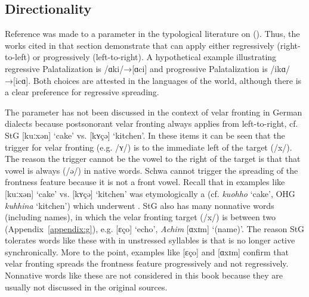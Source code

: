 \subsection{Directionality}\label{sec:6.5.2}

Reference was made to a  parameter in the typological literature on  (). Thus, the works cited in that section demonstrate that  can apply either regressively (right-to-left) or progressively (left-to-right). A hypothetical example illustrating regressive Palatalization is /ɑki/→[ɑci] and progressive Palatalization is /ikɑ/→[icɑ]. Both choices are attested in the languages of the world, although there is a clear preference for regressive spreading.

The  parameter has not been discussed in the context of velar fronting in German dialects because postsonorant velar fronting always applies from left-to-right, cf. StG [kuːxən] ‘cake’ vs. [kʏçə] ‘kitchen’. In these items it can be seen that the trigger for velar fronting (e.g. /ʏ/) is to the immediate left of the target (/x/). The reason the trigger cannot be the vowel to the right of the target is that that vowel is always  (/ə/) in native words. Schwa cannot trigger the spreading of the frontness feature because it is not a front vowel. Recall that  in examples like [kuːxən] ‘cake’ vs. [kʏçə] ‘kitchen’ was etymologically a  (cf.  \textit{kuohho} ‘cake’, OHG \textit{kuhhina} ‘kitchen’) which underwent . StG also has many nonnative words (including names), in which the velar fronting target (/x/) is between two  (Appendix~\ref{appendix:g}), e.g. [ɛço] ‘echo’, \textit{Achim} [ɑxɪm] ‘(name)’. The reason StG tolerates words like these with  in unstressed syllables is that  is no longer active synchronically. More to the point, examples like [ɛço] and [ɑxɪm] confirm that velar fronting spreads the frontness feature progressively and not regressively. Nonnative words like these are not considered in this book because they are usually not discussed in the original sources.

